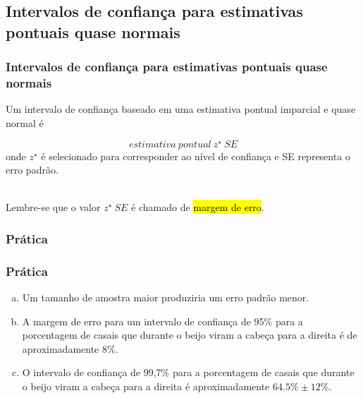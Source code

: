 \subsection{Intervalos de confiança para estimativas pontuais quase normais}


\begin{frame}
\frametitle{Intervalos de confiança para estimativas pontuais quase normais}
\justifying
Um intervalo de confiança baseado em uma estimativa pontual imparcial e quase normal é

\[ estimativa~pontual~ z^\star~ SE  \]
\justifying
onde $z^\star$ é selecionado para corresponder ao nível de confiança e SE representa o erro padrão.

$\:$ \\
\justifying
Lembre-se que o valor $z^\star~ SE$ é chamado de \hl{margem de erro}.

\end{frame}


\begin{frame}
\frametitle{Prática}

\justifying
{}

\end{frame}

\begin{frame}

\frametitle{Prática}

\begin{enumerate}[(a)]
\justifying
{}
\justifying
\item Um tamanho de amostra maior produziria um erro padrão menor.
\justifying
\item A margem de erro para um intervalo de confiança de 95\% para a porcentagem de casais que durante o beijo viram a cabeça para a direita é de aproximadamente 8\%.
\justifying
\item O intervalo de confiança de 99,7\% para a porcentagem de casais que durante o beijo viram a cabeça para a direita é aproximadamente $64.5\% \pm 12\%$.
\end{enumerate}


\vfill
\justifying
{}

\end{frame}

